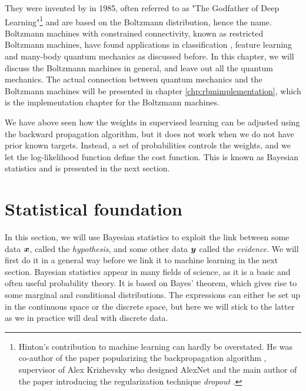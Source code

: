 They were invented by \citet{ackley_learning_1985} in 1985, often referred to as "The Godfather of Deep Learning"\footnote{Hinton's contribution to machine learning can hardly be overstated. He was co-author of the paper popularizing the backpropagation algorithm \cite{rumelhart_learning_1986}, supervisor of Alex Krizhevsky who designed AlexNet \cite{krizhevsky_imagenet_2012} and the main author of the paper introducing the regularization technique \textit{dropout} \cite{hinton_improving_2012}.} and are based on the Boltzmann distribution, hence the name. Boltzmann machines with constrained connectivity, known as restricted Boltzmann machines, have found applications in classification \cite{larochelle_classification_2008}, feature learning \cite{coates_analysis_2011} and many-body quantum mechanics \cite{carleo_solving_2017} as discussed before. In this chapter, we will discuss the Boltzmann machines in general, and leave out all the quantum mechanics. The actual connection between quantum mechanics and the Boltzmann machines will be presented in chapter \ref{chp:rbmimplementation}, which is the implementation chapter for the Boltzmann machines.

We have above seen how the weights in supervised learning can be adjusted using the backward propagation algorithm, but it does not work when we do not have prior known targets. Instead, a set of probabilities controls the weights, and we let the log-likelihood function define the cost function. This is known as Bayesian statistics and is presented in the next section.

\section{Statistical foundation} \label{sec:bayes}
In this section, we will use Bayesian statistics to exploit the link between some data $\boldsymbol{{x}}$, called the \textit{hypothesis}, and some other data $\boldsymbol{{y}}$ called the \textit{evidence}.  We will first do it in a general way before we link it to machine learning in the next section. Bayesian statistics appear in many fields of science, as it is a basic and often useful probability theory. It is based on Bayes' theorem, which gives rise to some marginal and conditional distributions. The expressions can either be set up in the continuous space or the discrete space, but here we will stick to the latter as we in practice will deal with discrete data. 

